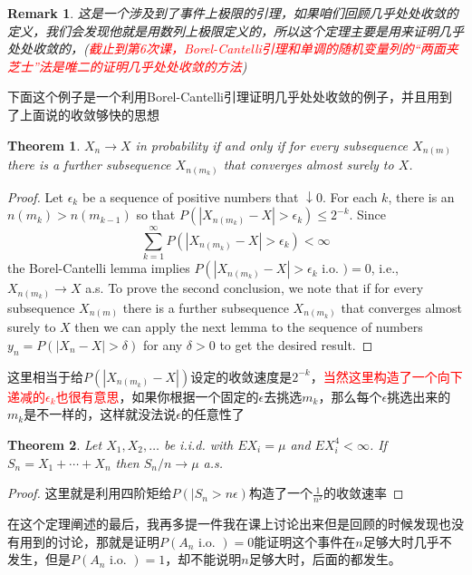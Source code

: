 \documentclass{article}
\newtheorem{theorem}{Theorem}[section]
\newtheorem*{proof}{Proof}
\newtheorem{remark}{Remark}[theorem]
\begin{document}
\begin{remark}
	这是一个涉及到了事件上极限的引理，如果咱们回顾几乎处处收敛的定义，我们会发现他就是用数列上极限定义的，所以这个定理主要是用来证明几乎处处收敛的，(\textcolor{red}{截止到第6次课，Borel-Cantelli引理和单调的随机变量列的“两面夹芝士”法是唯二的证明几乎处处收敛的方法})
\end{remark}
下面这个例子是一个利用Borel-Cantelli引理证明几乎处处收敛的例子，并且用到了上面说的收敛够快的思想
\begin{theorem}
	\label{application of Borel 1th lemma}
	$X_n \rightarrow X$ in probability if and only if for every subsequence $X_{n(m)}$ there is a further subsequence $X_{n\left(m_k\right)}$ that converges almost surely to $X$.
\end{theorem}
\begin{proof}
	 Let $\epsilon_k$ be a sequence of positive numbers that $\downarrow 0$. For each $k$, there is an $n\left(m_k\right)>n\left(m_{k-1}\right)$ so that $P\left(\left|X_{n\left(m_k\right)}-X\right|>\epsilon_k\right) \leq 2^{-k}$. Since
	$$
	\sum_{k=1}^{\infty} P\left(\left|X_{n\left(m_k\right)}-X\right|>\epsilon_k\right)<\infty
	$$
	the Borel-Cantelli lemma implies $P\left(\left|X_{n\left(m_k\right)}-X\right|>\epsilon_k\right.$ i.o. $)=0$, i.e., $X_{n\left(m_k\right)} \rightarrow X$ a.s. To prove the second conclusion, we note that if for every subsequence $X_{n(m)}$ there is a further subsequence $X_{n\left(m_k\right)}$ that converges almost surely to $X$ then we can apply the next lemma to the sequence of numbers $y_n=P\left(\left|X_n-X\right|>\delta\right)$ for any $\delta>0$ to get the desired result.
\end{proof}
这里相当于给$P\left(\left|X_{n\left(m_k\right)}-X\right|\right)$设定的收敛速度是$2^{-k}$，\textcolor{red}{当然这里构造了一个向下递减的$\epsilon_k$也很有意思}，如果你根据一个固定的$\epsilon$去挑选$m_k$，那么每个$\epsilon$挑选出来的$m_k$是不一样的，这样就没法说$\epsilon$的任意性了
\begin{theorem}
	Let $X_1, X_2, \ldots$ be i.i.d. with $E X_i=\mu$ and $E X_i^4<\infty$. If $S_n=X_1+\cdots+X_n$ then $S_n / n \rightarrow \mu$ a.s.
\end{theorem}
\begin{proof}
	这里就是利用四阶矩给$P(|S_n>n\epsilon)$构造了一个$\frac{1}{n^2}$的收敛速率
\end{proof}
在这个定理阐述的最后，我再多提一件我在课上讨论出来但是回顾的时候发现也没有用到的讨论，那就是证明$	P\left(A_n \text { i.o. }\right)=0$能证明这个事件在$n$足够大时几乎不发生，但是$P\left(A_n \text { i.o. }\right)=1$，却不能说明$n$足够大时，后面的都发生。
\end{document}
